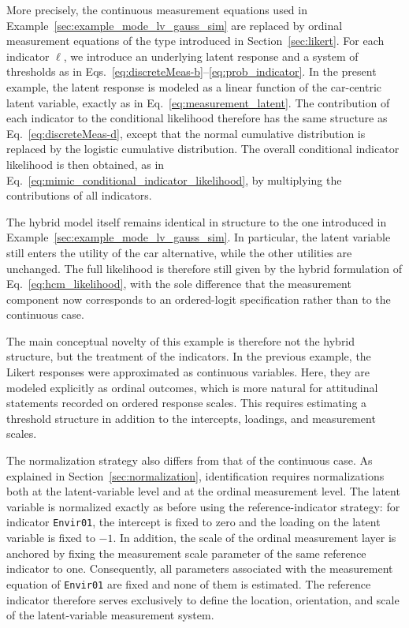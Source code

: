 \documentclass[12pt,a4paper]{article}
\begin{document}
More precisely, the continuous measurement equations used in
Example~\ref{sec:example_mode_lv_gauss_sim} are replaced by ordinal
measurement equations of the type introduced in
Section~\ref{sec:likert}. For each indicator \(\ell\), we introduce an
underlying latent response and a system of thresholds as in
Eqs.~\eqref{eq:discreteMeas-b}--\eqref{eq:prob_indicator}. In the
present example, the latent response is modeled as a linear function
of the car-centric latent variable, exactly as in
Eq.~\eqref{eq:measurement_latent}. The contribution of each indicator
to the conditional likelihood therefore has the same structure as
Eq.~\eqref{eq:discreteMeas-d}, except that the normal cumulative
distribution is replaced by the logistic cumulative distribution. The
overall conditional indicator likelihood is then obtained, as in
Eq.~\eqref{eq:mimic_conditional_indicator_likelihood}, by multiplying
the contributions of all indicators.

The hybrid model itself remains identical in structure to the one
introduced in Example~\ref{sec:example_mode_lv_gauss_sim}. In
particular, the latent variable still enters the utility of the car
alternative, while the other utilities are unchanged. The full
likelihood is therefore still given by the hybrid formulation of
Eq.~\eqref{eq:hcm_likelihood}, with the sole difference that the
measurement component now corresponds to an ordered-logit
specification rather than to the continuous case.

The main conceptual novelty of this example is therefore not the
hybrid structure, but the treatment of the indicators. In the previous
example, the Likert responses were approximated as continuous
variables. Here, they are modeled explicitly as ordinal outcomes,
which is more natural for attitudinal statements recorded on ordered
response scales. This requires estimating a threshold structure in
addition to the intercepts, loadings, and measurement scales.


The normalization strategy also differs from that of the continuous
case. As explained in Section~\ref{sec:normalization}, identification
requires normalizations both at the latent-variable level and at the
ordinal measurement level. The latent variable is normalized exactly
as before using the reference-indicator strategy: for indicator
\texttt{Envir01}, the intercept is fixed to zero and the loading on
the latent variable is fixed to \(-1\). In addition, the scale of the
ordinal measurement layer is anchored by fixing the measurement scale
parameter of the same reference indicator to one. Consequently, all
parameters associated with the measurement equation of
\texttt{Envir01} are fixed and none of them is estimated. The
reference indicator therefore serves exclusively to define the
location, orientation, and scale of the latent-variable measurement
system.
\end{document}
